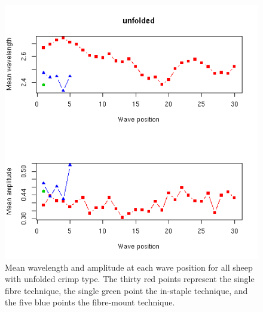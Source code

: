 %

\begin{figure}[!h]
  \centering
  \includegraphics[width=1.0\textwidth]{figunfold.png}
  \caption{Mean wavelength and amplitude at each wave position for all sheep with unfolded crimp type. The thirty red points represent the single fibre technique, the single green point the in-staple technique, and the five blue points the fibre-mount technique.}
  \label{fig:unfold}
\end{figure}

%

